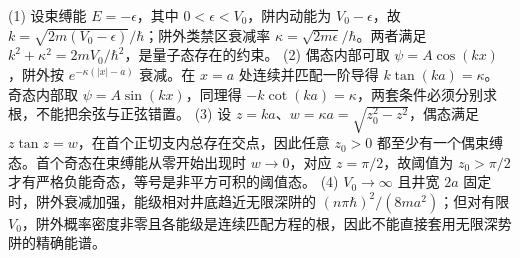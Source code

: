 (1) 设束缚能 \(E=-\epsilon\)，其中 \(0<\epsilon<V_0\)，阱内动能为 \(V_0-\epsilon\)，故 \(k=\sqrt{2m(V_0-\epsilon)}/\hbar\)；阱外类禁区衰减率 \(\kappa=\sqrt{2m\epsilon}/\hbar\)。两者满足 \(k^2+\kappa^2=2mV_0/\hbar^2\)，是量子态存在的约束。
(2) 偶态内部可取 \(\psi=A\cos(kx)\)，阱外按 \(e^{-\kappa(|x|-a)}\) 衰减。在 \(x=a\) 处连续并匹配一阶导得 \(k\tan(ka)=\kappa\)。奇态内部取 \(\psi=A\sin(kx)\)，同理得 \(-k\cot(ka)=\kappa\)，两套条件必须分别求根，不能把余弦与正弦错置。
(3) 设 \(z=ka\)、\(w=\kappa a=\sqrt{z_0^2-z^2}\)，偶态满足 \(z\tan z=w\)，在首个正切支内总存在交点，因此任意 \(z_0>0\) 都至少有一个偶束缚态。首个奇态在束缚能从零开始出现时 \(w\to0\)，对应 \(z=\pi/2\)，故阈值为 \(z_0>\pi/2\) 才有严格负能奇态，等号是非平方可积的阈值态。
(4) \(V_0\to\infty\) 且井宽 \(2a\) 固定时，阱外衰减加强，能级相对井底趋近无限深阱的 \((n\pi\hbar)^2/(8ma^2)\)；但对有限 \(V_0\)，阱外概率密度非零且各能级是连续匹配方程的根，因此不能直接套用无限深势阱的精确能谱。
